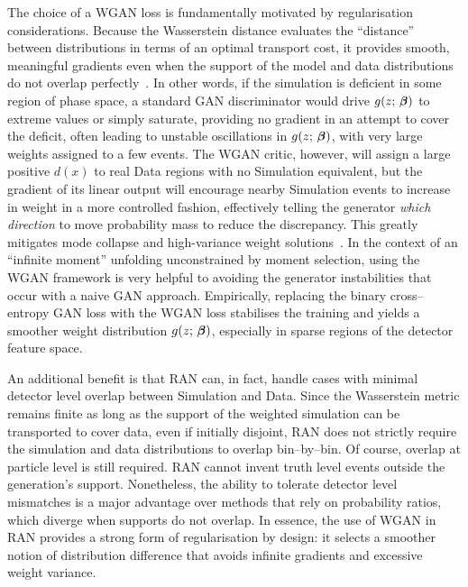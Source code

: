 {{            The choice of a WGAN loss is fundamentally motivated by regularisation considerations.
            Because the Wasserstein distance evaluates the ``distance'' between distributions in terms of an optimal transport cost, it provides smooth, meaningful gradients even when the support of the model and data distributions do not overlap perfectly~\cite{arjovsky_wasserstein_2017, arjovsky_towards_2017}.
            In other words, if the simulation is deficient in some region of phase space, a standard GAN discriminator would drive $g(z;\,\vb*\beta)$ to extreme values or simply saturate, providing no gradient in an attempt to cover the deficit, often leading to unstable oscillations in $g(z;\,\vb*\beta)$, with very large weights assigned to a few events.
            The WGAN critic, however, will assign a large positive $d(x)$ to real Data regions with no Simulation equivalent, but the gradient of its linear output will encourage nearby Simulation events to increase in weight in a more controlled fashion, effectively telling the generator \emph{which direction} to move probability mass to reduce the discrepancy.
            This greatly mitigates mode collapse and high-variance weight solutions~\cite{rosca_case_2021, doan_image_2020}.
            In the context of an ``infinite moment'' unfolding unconstrained by moment selection, using the WGAN framework is very helpful to avoiding the generator instabilities that occur with a naive GAN approach.
            Empirically, replacing the binary cross--entropy GAN loss with the WGAN loss stabilises the training and yields a smoother weight distribution $g(z;\,\vb*\beta)$, especially in sparse regions of the detector feature space.
            
            An additional benefit is that RAN can, in fact, handle cases with minimal detector level overlap between Simulation and Data.
            Since the Wasserstein metric remains finite as long as the support of the weighted simulation can be transported to cover data, even if initially disjoint, RAN does not strictly require the simulation and data distributions to overlap bin--by--bin.
            Of course, overlap at particle level is still required.
            RAN cannot invent truth level events outside the generation’s support.
            Nonetheless, the ability to tolerate detector level mismatches is a major advantage over methods that rely on probability ratios, which diverge when supports do not overlap.
            In essence, the use of WGAN in RAN provides a strong form of regularisation by design: it selects a smoother notion of distribution difference that avoids infinite gradients and excessive weight variance.
}}
